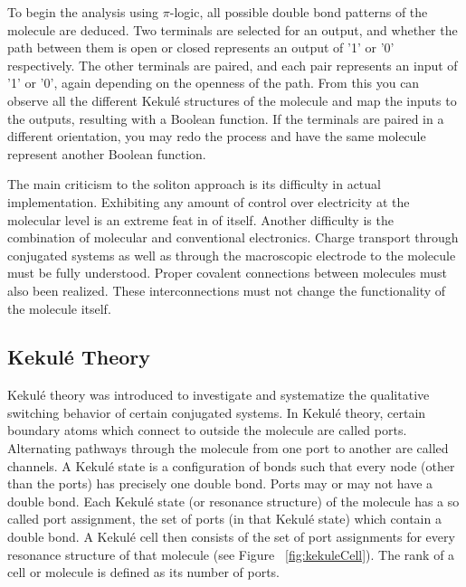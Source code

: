 \documentclass[12pt]{article}
\begin{document}
To begin the analysis using $\pi$-logic, all possible double bond patterns of the molecule are deduced. Two terminals are selected for an output, and whether the path between them is open or closed represents an output of '1' or '0' respectively. The other terminals are paired, and each pair represents an input of '1' or '0', again depending on the openness of the path. From this you can observe all the different Kekul\'e structures of the molecule and map the inputs to the outputs, resulting with a Boolean function. If the terminals are paired in a different orientation, you may redo the process and have the same molecule represent another Boolean function. 

The main criticism to the soliton approach is its difficulty in actual implementation. Exhibiting any amount of control over electricity at the molecular level is an extreme feat in of itself. Another difficulty is the combination of molecular and conventional electronics. Charge transport through conjugated systems as well as through the macroscopic electrode to the molecule must be fully understood. Proper covalent connections between molecules must also been realized. These interconnections must not change the functionality of the molecule itself. 

\subsection{Kekul\'e Theory}

Kekul\'e theory \cite{H13, HH13} was introduced to investigate and systematize the qualitative switching behavior of certain conjugated systems. In Kekul\'e theory, certain boundary atoms which connect to outside the molecule are called ports.  Alternating pathways through the molecule from one port to another are called channels. A Kekul\'e state is a configuration of bonds such that every node (other than the ports) has precisely one double bond. Ports may or may not have a double bond. Each Kekul\'e state (or resonance structure) of the molecule has a so called port assignment, the set of ports (in that Kekul\'e state) which contain a double bond. A Kekul\'e cell then consists of the set of port assignments for every resonance structure of that molecule (see Figure ~\ref{fig:kekuleCell}). The rank of a cell or molecule is defined as its number of ports.
\end{document}
